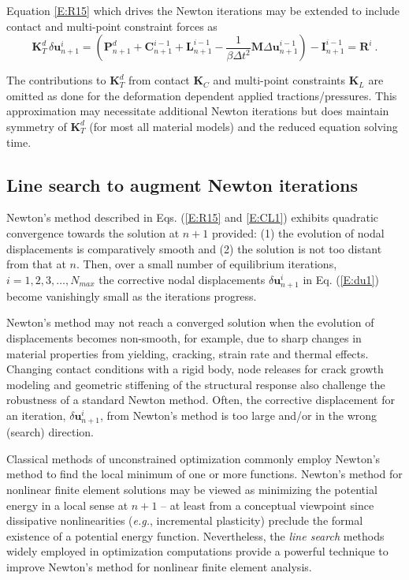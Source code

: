 \documentclass[11pt]{report}
\numberwithin{equation}{section}
\newcommand{\eg}{\emph{e.g.},\xspace}
\newcommand{\ti}{\emph}
\begin{document}
Equation \ref{E:R15} which drives the Newton iterations may be extended to include contact 
and multi-point constraint forces
as 
%
\begin{equation}\label{E:CL1}
\mathbf{K}_T^d \, \delta\bm{u}_{n+1}^i= \left ( \bm{P}_{n+1}^d  + \bm{C}_{n+1}^{i-1} + 
\bm{L}_{n+1}^{i-1}  - \frac{1}{\beta \Delta t^2} 
 \mathbf{M} {\Delta\bm{u}}_{n+1}^{i-1}\right ) - \bm{I}_{n+1}^{i-1}=\bm{R}^i\ .
\end{equation}
%

\noindent The contributions to $\mathbf{K}_T^d$ from contact  $\mathbf{K}_C$  and multi-point constraints 
$\mathbf{K}_L$ are omitted as done for the deformation dependent applied tractions/pressures. This 
approximation may 
necessitate additional Newton iterations but does maintain symmetry of $\mathbf{K}_T^d$  (for most all material
models) and the reduced equation solving time.

\subsection{Line search to augment Newton iterations}

\noindent Newton's method described in Eqs. (\ref{E:R15} and \ref{E:CL1}) exhibits quadratic 
convergence towards the solution at $n+1$ provided: (1) the evolution of nodal displacements is
comparatively smooth and (2) the solution is not too distant from that at $n$. Then, over a small number of
equilibrium iterations, $i=1, 2, 3, \dots, N_{max}$ the corrective nodal displacements $\delta \bm{u}_{n+1}^i$ in Eq. (\ref{E:du1})
become vanishingly small as the iterations progress.

Newton's method may not reach a converged solution when the evolution of displacements 
becomes non-smooth, for example,
due to sharp changes in material properties from yielding, cracking, strain rate and thermal effects. Changing
contact conditions with a rigid body, node releases for crack growth
modeling and geometric stiffening of the structural response also challenge the robustness of
a standard Newton method. Often, the corrective displacement 
for an iteration, $\delta \bm{u}_{n+1}^i$, from Newton's method
is too large and/or in the wrong (search) direction.

Classical methods of unconstrained optimization commonly employ Newton's method to find the local
minimum of  one or more functions.
Newton's method for nonlinear finite element solutions may be viewed as minimizing the potential energy  in a local
sense at $n+1$ -- at least 
from a conceptual viewpoint since dissipative nonlinearities (\eg incremental plasticity)
preclude the formal existence of a potential energy function.
Nevertheless, the \ti{line search} methods widely employed in optimization computations provide a
powerful technique to improve Newton's method for nonlinear finite element analysis.
\end{document}
